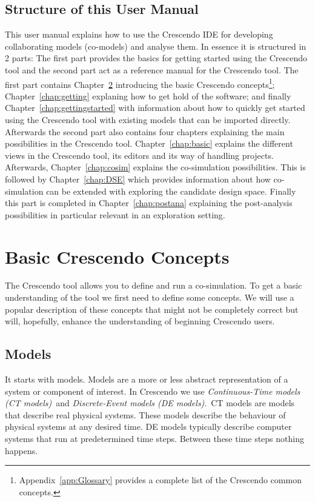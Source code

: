 \documentclass{crescendorepchap}
\begin{document}
\section{Structure of this User Manual}\label{sec:structure}

This user manual explains how to use the Crescendo IDE for developing collaborating models
 (co-models) and analyse them. In essence it is structured in 2 parts: The first part provides the basics for getting started using the Crescendo tool and the second part act as a reference manual for the Crescendo tool. The first part contains Chapter~\ref{chap:introconcepts} introducing the basic Crescendo concepts\footnote{Appendix~\ref{app:Glossary} provides a complete list of the Crescendo common concepts.};
Chapter~\ref{chap:getting} explaning how to get hold of the software; and finally
Chapter~\ref{chap:gettingstarted} with information about how to quickly get started using the Crescendo tool with existing models that can be imported directly. Afterwards the second part also contains four chapters explaining the main possibilities in the Crescendo tool. Chapter~\ref{chap:basic} explains the different views in the Crescendo tool, its editors and its way of handling projects. Afterwards, Chapter~\ref{chap:cosim} explains the co-simulation possibilities. This is followed by Chapter~\ref{chap:DSE} which provides information about how co-simulation can be extended with exploring the candidate design space. Finally this part is completed in Chapter~\ref{chap:postana} explaining the post-analysis possibilities in particular relevant in an exploration setting.

\chapter{Basic Crescendo Concepts}\label{chap:introconcepts}

The Crescendo tool allows you to define and run a co-simulation. To get a
basic understanding of the tool we first need to define some concepts.
We will use a popular description of these concepts that might not
be completely correct but will, hopefully, enhance the understanding of
beginning Crescendo users.

\section{Models}

It starts with models. Models are a more or less abstract representation
of a system or component of interest. In Crescendo we use
\emph{Continuous-Time models (CT models)}~and \emph{Discrete-Event
models (DE models)}.~CT models are models that describe
real physical systems. These models describe the behaviour of physical
systems at any desired time. DE models typically describe
computer systems that run at predetermined time steps. Between these
time steps nothing happens.
\end{document}

